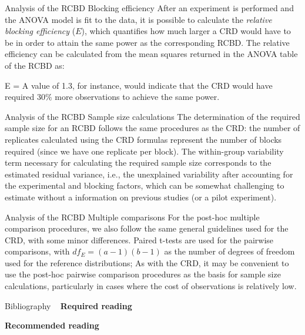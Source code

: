 \documentclass[t]{beamer}
\begin{document}

\begin{ftst}
{Analysis of the RCBD}
{Blocking efficiency}
After an experiment is performed and the ANOVA model is fit to the data, it is possible to calculate the \textit{relative blocking efficiency} ($E$), which quantifies how much larger a CRD would have to be in order to attain the same power as the corresponding RCBD.
\vone
The relative efficiency can be calculated from the mean squares returned in the ANOVA table of the RCBD as:

\beqs
E = 
\eqs
\vhalf
A value of 1.3, for instance, would indicate that the CRD would have required $30\%$ more observations to achieve the same power.
\end{ftst}


\begin{ftst}
{Analysis of the RCBD}
{Sample size calculations}
The determination of the required sample size for an RCBD follows the same procedures as the CRD: the number of replicates calculated using the CRD formulas represent the number of blocks required (since we have one replicate per block).
\vone
The within-group variability term necessary for calculating the required sample size corresponds to the estimated residual variance, i.e., the unexplained variability after accounting for the experimental and blocking factors, which can be somewhat challenging to estimate without a information on previous studies (or a pilot experiment).
\end{ftst}


\begin{ftst}
{Analysis of the RCBD}
{Multiple comparisons}
For the post-hoc multiple comparison procedures, we also follow the same general guidelines used for the CRD, with some minor differences.
\vone
Paired t-tests are used for the pairwise comparisons, with $df_E = (a-1)(b-1)$ as the number of degrees of freedom used for the reference distributions;
\vone
As with the CRD, it may be convenient to use the post-hoc pairwise comparison procedures as the basis for sample size calculations, particularly in cases where the cost of observations is relatively low.
\end{ftst}


\begin{ftst}
{Bibliography}
{\ }
\scriptsize
\textbf{Required reading}

\benums  
\eenum

\textbf{Recommended reading}

\benums 
\eenum
\end{ftst}
\end{document}
